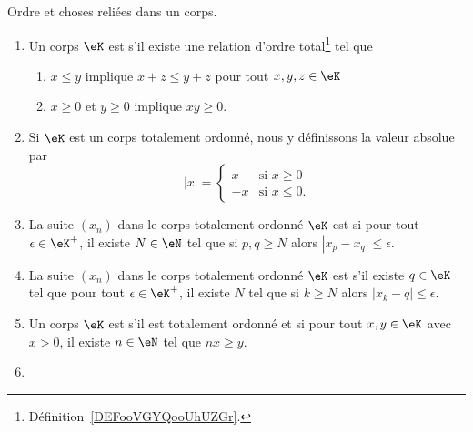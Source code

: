 \begin{definition}      \label{DefKCGBooLRNdJf}
    Ordre et choses reliées dans un corps.
    \begin{enumerate}
        \item \label{ITEMooOOOVooJWwIQr}
            Un corps \( \eK\) est  s'il existe une relation d'ordre total\footnote{Définition~\ref{DEFooVGYQooUhUZGr}.} tel que
            \begin{enumerate}
                \item       \label{ITEMooZISJooWNxnBj}
                    \( x\leq y\) implique \( x+z\leq y+z\) pour tout \( x,y,z\in \eK\)
                \item   \label{CONDooBYYDooElXgPO}
                    \( x\geq 0\) et \( y\geq 0\) implique \( xy\geq 0\).
            \end{enumerate}
        \item       \label{ItemooWUGSooRSRvYC}
            Si \( \eK\) est un corps totalement ordonné, nous y définissons la valeur absolue par
            \begin{equation}     
                | x |=\begin{cases}
                    x    &   \text{si }x\geq 0\\
                    -x    &    \text{si } x\leq 0.
                \end{cases}
            \end{equation}
        \item       \label{ItemVXOZooTYpcYN}
    La suite \( (x_n)\) dans le corps totalement ordonné \( \eK\) est  si pour tout \( \epsilon\in \eK^+\), il existe \( N\in \eN\) tel que si \( p,q\geq N\) alors \( | x_p-x_q |\leq \epsilon\).
\item       \label{ITEMooDERQooLmJwFR}
    La suite \( (x_n)\) dans le corps totalement ordonné \( \eK\) est  s'il existe \( q\in \eK\) tel que pour tout \( \epsilon\in \eK^+\), il existe \( N\) tel que si \( k\geq N\) alors \( | x_k-q |\leq \epsilon\).
\item   \label{ItemooDZQKooPsqeRf}
            Un corps \( \eK\) est  s'il est totalement ordonné et si pour tout \( x,y\in \eK\) avec \( x>0\), il existe \( n\in \eN\) tel que \( nx\geq y\).
        \item       \label{ITEMooKZZYooDaidGU}

\end{enumerate}
\end{definition}
